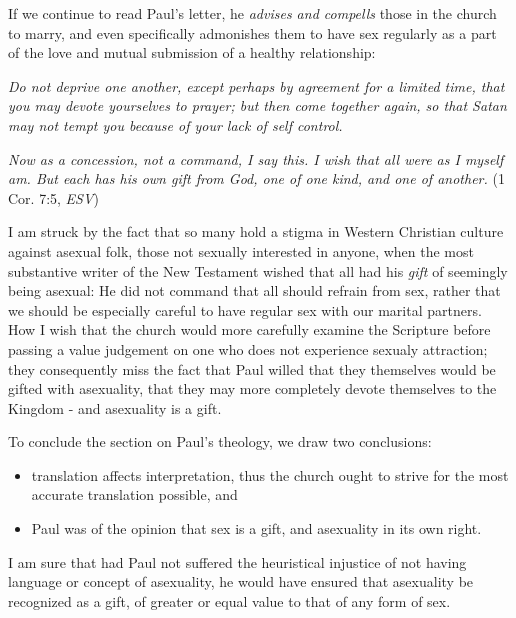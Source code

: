 \documentclass{article}
\begin{document}
    \par If we continue to read Paul's letter, he \textit{advises and compells}
        those in the church to marry, and even specifically admonishes them
        to have sex regularly as a part of the love and mutual submission
        of a healthy relationship:
        \par \textit{Do not deprive one another, except perhaps by agreement
        for a limited time, that you may devote yourselves to prayer; but
        then come together again, so that Satan may not tempt you because
        of your lack of self control.} 
        \par \textit{Now as a concession, not a command, I say this.
        I wish that all were as I myself am. But each has his own
        gift from God, one of one kind, and one of another.}
        (1 Cor. 7:5, \textit{ESV}) \\
        \par I am struck by the fact that so many hold a stigma in Western
        Christian culture against asexual folk, those not sexually
        interested in anyone, when the most substantive writer of the 
        New Testament wished that all had his \textit{gift} of seemingly
        being asexual: He did not command that all should refrain from sex,
        rather that we should be especially careful to have regular sex with
        our marital partners. How I wish that the church would more
        carefully examine the Scripture before passing a value judgement
        on one who does not experience sexualy attraction; they
        consequently miss the fact that Paul willed that they themselves
        would be gifted with asexuality, that they may more completely
        devote themselves to the Kingdom - and asexuality is a gift. \\

    \par To conclude the section on Paul's theology, we draw two conclusions:
        \begin{itemize}
            \item{translation affects interpretation, thus the church ought
                to strive for the most accurate translation possible, and}
            \item{Paul was of the opinion that sex is a gift, and
                asexuality in its own right.}
        \end{itemize}
        I am sure that had Paul not suffered the heuristical injustice of not
        having language or concept of asexuality, he would have ensured that
        asexuality be recognized as a gift, of greater or equal value to
        that of any form of sex.
\end{document}

